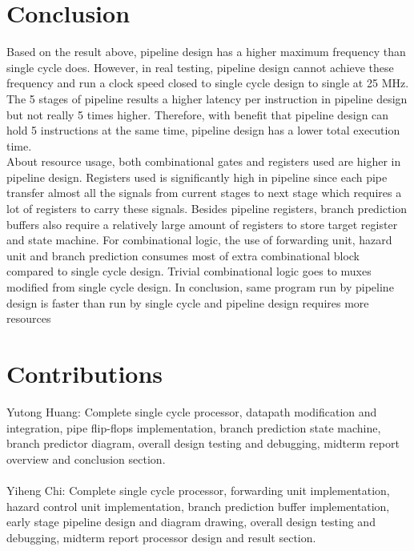 \documentclass[12pt]{article}
\begin{document}
  \section{Conclusion}

  Based on the result above, pipeline design has a higher maximum frequency than single cycle does. However, in real testing, pipeline design cannot achieve these frequency and run a clock speed closed to single cycle design to single at 25 MHz. The 5 stages of pipeline results a higher latency per instruction in pipeline design but not really 5 times higher. Therefore, with benefit that pipeline design can hold 5 instructions at the same time, pipeline design has a lower total execution time. \\ About resource usage, both combinational gates and registers used are higher in pipeline design. Registers used is significantly high in pipeline since each pipe transfer almost all the signals from current stages to next stage which requires a lot of registers to carry these signals. Besides pipeline registers, branch prediction buffers also require a relatively large amount of registers to store target register and state machine. For combinational logic, the use of forwarding unit, hazard unit and branch prediction consumes most of extra combinational block compared to single cycle design. Trivial combinational logic goes to muxes modified from single cycle design. In conclusion, same program run by pipeline design is faster than run by single cycle and pipeline design requires more resources


  \section{Contributions}

  Yutong Huang: Complete single cycle processor, datapath modification and integration, pipe flip-flops implementation, branch prediction state machine, branch predictor diagram, overall design testing and debugging, midterm report overview and conclusion section. \\ \\
  Yiheng Chi: Complete single cycle processor, forwarding unit implementation, hazard control unit implementation, branch prediction buffer implementation, early stage pipeline design and diagram drawing, overall design testing and debugging, midterm report processor design and result section.
\end{document}
